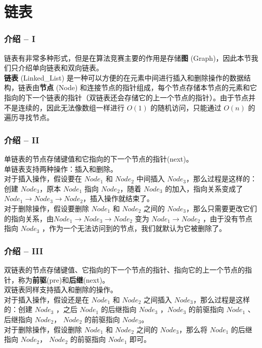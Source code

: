 \documentclass{beamer}
\newcommand{\fdf}[1]{\alert{\textbf{#1}}}
\begin{document}
\section{链表}
\begin{frame}
\frametitle{介绍 -- I}
链表有非常多种形式，但是在算法竞赛主要的作用是存储\fdf{图} (Graph)，因此本节我们只介绍单向链表和双向链表。\\
\fdf{链表} (Linked\_List) 是一种可以方便的在元素中间进行插入和删除操作的数据结构，链表由\fdf{节点} (Node) 和连接节点的指针组成，每个节点存储本节点的元素和它指向的下一个链表的指针（双链表还会存储它的上一个节点的指针）。由于节点并不是连续的，因此无法像数组一样进行 $O(1)$ 的随机访问，只能通过 $O(n)$ 的遍历寻找节点。
\end{frame}
\begin{frame}
\frametitle{介绍 -- II}
单链表的节点存储键值和它指向的下一个节点的指针(next)。\\ 
单链表支持两种操作：插入和删除。\\ 
对于插入操作，假设要在 $Node_1$ 和 $Node_2$ 中间插入 $Node_3$，那么过程是这样的：创建 $Node_3$，原本 $Node_1$ 指向 $Node_2$，随着 $Node_3$ 的加入，指向关系变成了 $Node_1 \rightarrow Node_3 \rightarrow Node_2$，插入操作就结束了。\\ 
对于删除操作，假设要删除 $Node_1$ 和 $Node_2$ 之间的 $Node_3$，那么只需要更改它们的指向关系，由$Node_1 \rightarrow Node_3 \rightarrow Node_2$ 变为 $Node_1 \rightarrow Node_2$ ，由于没有节点指向 $Node_3$ ，作为一个无法访问到的节点，我们就默认为它被删除了。
\end{frame}
\begin{frame}
\frametitle{介绍 -- III}
双链表的节点存储键值、它指向的下一个节点的指针、指向它的上一个节点的指针，称为\fdf{前驱}(pre)和\fdf{后继}(next)。\\ 
双链表同样支持插入和删除的操作。\\ 
对于插入操作，假设还是在 $Node_1$ 和 $Node_2$ 之间插入 $Node_3$，那么过程是这样的：创建 $Node_3$ ，之后 $Node_1$ 的后继指向 $Node_3$ ，$Node_3$ 的前驱指向 $Node_1$ 、后继指向 $Node_2$， $Node_2$ 的前驱指向 $Node_3$。\\
对于删除操作，假设删除 $Node_1$ 和 $Node_2$ 之间的 $Node_3$，那么将 $Node_1$ 的后继指向 $Node_2$， $Node_2$ 的前驱指向 $Node_1$ 即可。
\end{frame}
\end{document}
